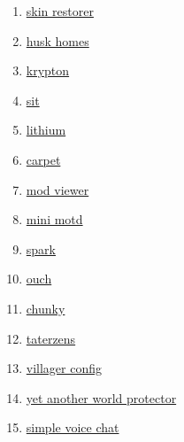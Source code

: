 \begin{enumerate}
    \item \href{https://github.com/Suiranoil/SkinRestorer}{skin restorer}
    \item \href{https://github.com/WiIIiam278/HuskHomes/}{husk homes}
    \item \href{https://github.com/astei/krypton}{krypton}
    \item \href{https://github.com/bl4ckscor3/Sit}{sit}
    \item \href{https://github.com/caffeinemc/lithium-fabric}{lithium}
    \item \href{https://github.com/gnembon/fabric-carpet}{carpet}
    \item \href{https://github.com/haykam821/Mod-Viewer}{mod viewer}
    \item \href{https://github.com/jpenilla/MiniMOTD}{mini motd}
    \item \href{https://github.com/lucko/spark}{spark}
    \item \href{https://github.com/patbox/ouch}{ouch}
    \item \href{https://github.com/pop4959/Chunky}{chunky}
    \item \href{https://github.com/samolego/Taterzens/}{taterzens}
    \item \href{https://modrinth.com/mod/villagerconfig}{villager config}
    \item \href{https://modrinth.com/mod/yawp}{yet another world protector}
    \item \href{https://modrinth.com/plugin/simple-voice-chat}{simple voice chat}
\end{enumerate}



